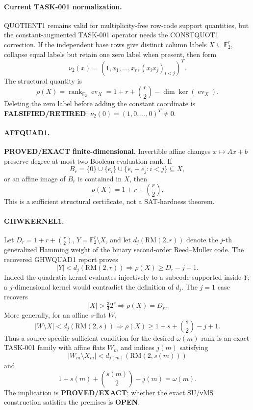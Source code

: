 \documentclass[11pt]{article}
\begin{document}
\paragraph{Current TASK-001 normalization.}
QUOTIENT1 remains valid for multiplicity-free row-code support quantities, but the constant-augmented TASK-001 operator needs the CONSTQUOT1 correction.  If the independent base rows give distinct column labels \(X\subseteq\mathbb F_2^r\), collapse equal labels but retain one zero label when present, then form
\[
 \nu_2(x)=\left(1,x_1,\ldots,x_r,(x_ix_j)_{i<j}\right)^T.
\]
The structural quantity is
\[
 \rho(X)=\operatorname{rank}_{\mathbb F_2}\operatorname{ev}_X
 =1+r+\binom r2-\dim\ker(\operatorname{ev}_X).
\]
Deleting the zero label before adding the constant coordinate is \textbf{FALSIFIED/RETIRED}: \(\nu_2(0)=(1,0,\ldots,0)^T\neq0\).

\paragraph{AFFQUAD1.}
\textbf{PROVED/EXACT finite-dimensional.}  Invertible affine changes \(x\mapsto Ax+b\) preserve degree-at-most-two Boolean evaluation rank.  If
\[
 B_r=\{0\}\cup\{e_i\}\cup\{e_i+e_j:i<j\}\subseteq X,
\]
or an affine image of \(B_r\) is contained in \(X\), then
\[
 \rho(X)=1+r+\binom r2.
\]
This is a sufficient structural certificate, not a SAT-hardness theorem.

\paragraph{GHWKERNEL1.}
Let \(D_r=1+r+\binom r2\), \(Y=\mathbb F_2^r\setminus X\), and let \(d_j(\mathrm{RM}(2,r))\) denote the \(j\)-th generalized Hamming weight of the binary second-order Reed--Muller code.  The recovered GHWQUAD1 report proves
\[
 \boxed{
 |Y|<d_j(\mathrm{RM}(2,r))
 \Longrightarrow
 \rho(X)\ge D_r-j+1.
 }
\]
Indeed the quadratic kernel evaluates injectively to a subcode supported inside \(Y\); a \(j\)-dimensional kernel would contradict the definition of \(d_j\).  The \(j=1\) case recovers
\[
 |X|>\tfrac34 2^r\Longrightarrow \rho(X)=D_r.
\]
More generally, for an affine \(s\)-flat \(W\),
\[
 |W\setminus X|<d_j(\mathrm{RM}(2,s))
 \Longrightarrow
 \rho(X)\ge1+s+\binom s2-j+1.
\]
Thus a source-specific sufficient condition for the desired \(\omega(m)\) rank is an exact TASK-001 family with affine flats \(W_m\) and indices \(j(m)\) satisfying
\[
 |W_m\setminus X_m|<d_{j(m)}(\mathrm{RM}(2,s(m)))
\]
and
\[
 1+s(m)+\binom{s(m)}2-j(m)=\omega(m).
\]
The implication is \textbf{PROVED/EXACT}; whether the exact SU/vMS construction satisfies the premises is \textbf{OPEN}.
\end{document}

